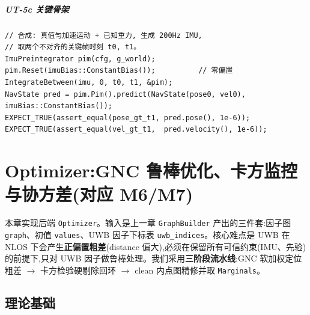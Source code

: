 \documentclass[11pt,a4paper]{report}
\newcommand{\bp}{\bm{p}}
\newcommand{\bv}{\bm{v}}
\newcommand{\bb}{\bm{b}}
\newcommand{\bR}{\bm{R}}
\newcommand{\bT}{\bm{T}}
\begin{document}
\paragraph{UT-5c 关键骨架}
\begin{lstlisting}[style=cpp]
// 合成: 真值匀加速运动 + 已知重力, 生成 200Hz IMU,
// 取两个不对齐的关键帧时刻 t0, t1。
ImuPreintegrator pim(cfg, g_world);
pim.Reset(imuBias::ConstantBias());          // 零偏置
IntegrateBetween(imu, 0, t0, t1, &pim);
NavState pred = pim.Pim().predict(NavState(pose0, vel0), imuBias::ConstantBias());
EXPECT_TRUE(assert_equal(pose_gt_t1, pred.pose(), 1e-6));
EXPECT_TRUE(assert_equal(vel_gt_t1,  pred.velocity(), 1e-6));
\end{lstlisting}



\chapter{Optimizer:GNC 鲁棒优化、卡方监控与协方差(对应 M6/M7)}

本章实现后端 \texttt{Optimizer}。输入是上一章 \texttt{GraphBuilder} 产出的三件套:因子图 \texttt{graph}、初值 \texttt{values}、UWB 因子下标表 \texttt{uwb\_indices}。核心难点是 UWB 在 NLOS 下会产生\textbf{正偏置粗差}(distance 偏大),必须在保留所有可信约束(IMU、先验)的前提下,只对 UWB 因子做鲁棒处理。我们采用\textbf{三阶段流水线}:GNC 软加权定位粗差 $\to$ 卡方检验硬剔除回环 $\to$ clean 内点图精修并取 \texttt{Marginals}。

\section{理论基础}
\end{document}

